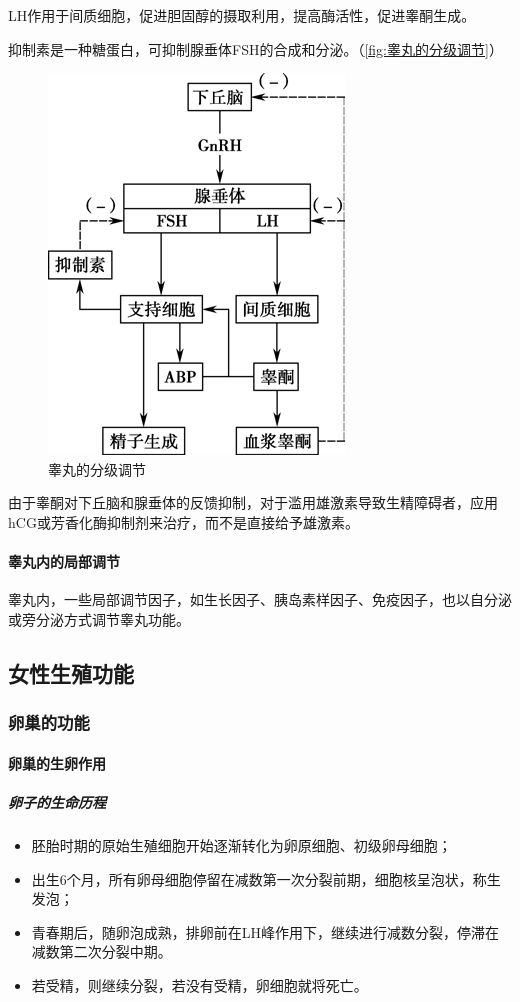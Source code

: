 LH作用于间质细胞，促进胆固醇的摄取利用，提高酶活性，促进睾酮生成。

抑制素是一种糖蛋白，可抑制腺垂体FSH的合成和分泌。（\autoref{fig:睾丸的分级调节}）

\begin{figure}[htbp]
	\centering
	\includegraphics[width=0.3\linewidth]{Pics/睾丸的分级调节}
	\caption{睾丸的分级调节}
	\label{fig:睾丸的分级调节}
\end{figure}


由于睾酮对下丘脑和腺垂体的反馈抑制，对于滥用雄激素导致生精障碍者，应用hCG或芳香化酶抑制剂来治疗，而不是直接给予雄激素。

\paragraph{睾丸内的局部调节}

睾丸内，一些局部调节因子，如生长因子、胰岛素样因子、免疫因子，也以自分泌或旁分泌方式调节睾丸功能。

\subsection{女性生殖功能}

\subsubsection{卵巢的功能}

\paragraph{卵巢的生卵作用}

\subparagraph{卵子的生命历程}

\begin{itemize}
	\item 胚胎时期的原始生殖细胞开始逐渐转化为卵原细胞、初级卵母细胞；
	\item 出生6个月，所有卵母细胞停留在减数第一次分裂前期，细胞核呈泡状，称生发泡；
	\item 青春期后，随卵泡成熟，排卵前在LH峰作用下，继续进行减数分裂，停滞在减数第二次分裂中期。
	\item 若受精，则继续分裂，若没有受精，卵细胞就将死亡。
\end{itemize}

